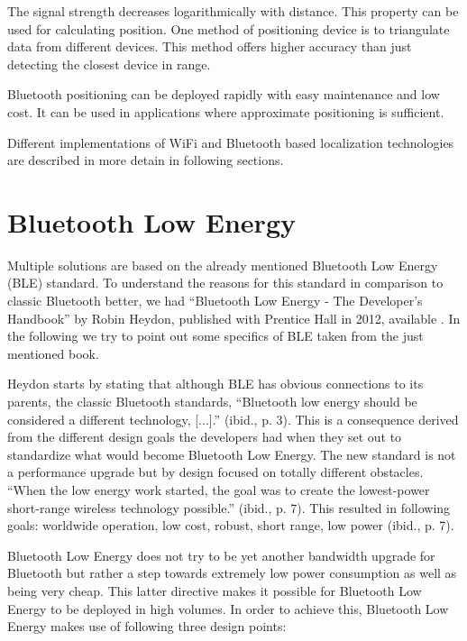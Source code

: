 The signal strength decreases logarithmically with distance. This property can be used for calculating position. One method of positioning device is to triangulate data from different devices. This method offers higher accuracy than just detecting the closest device in range.

Bluetooth positioning can be deployed rapidly with easy maintenance and low cost. It can be used in applications where approximate positioning is sufficient.

Different implementations of WiFi and Bluetooth based localization technologies are described in more detain in following sections.


\vspace{0.5cm}

\section{Bluetooth Low Energy}

Multiple solutions are based on the already mentioned Bluetooth Low Energy (BLE) standard. To understand the reasons for this standard in comparison to classic Bluetooth better, we had \enquote{Bluetooth Low Energy - The Developer's Handbook} by Robin Heydon, published with Prentice Hall in 2012, available \cite{heydon2012bluetooth}. In the following we try to point out some specifics of BLE taken from the just mentioned book.

Heydon starts by stating that although BLE has obvious connections to its parents, the classic Bluetooth standards, \enquote{Bluetooth low energy should be considered a different technology, [...].} (ibid., p. 3). This is a consequence derived from the different design goals the developers had when they set out to standardize what would become Bluetooth Low Energy. The new standard is not a performance upgrade but by design focused on totally different obstacles. \enquote{When the low energy work started, the goal was to create the lowest-power short-range wireless technology possible.} (ibid., p. 7). This resulted in following goals: worldwide operation, low cost, robust, short range, low power (ibid., p. 7).

Bluetooth Low Energy does not try to be yet another bandwidth upgrade for Bluetooth but rather a step towards extremely low power consumption as well as being very cheap. This latter directive makes it possible for Bluetooth Low Energy to be deployed in high volumes. In order to achieve this, Bluetooth Low Energy makes use of following three design points:

